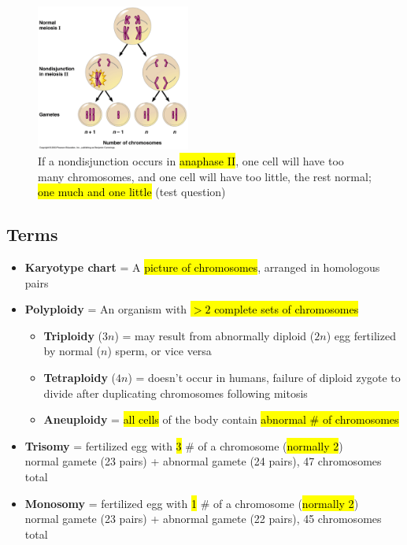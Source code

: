 \documentclass[a4paper,12pt]{article}
\begin{document}
\begin{figure}[H]
    \centering
    \includegraphics[width=0.45\textwidth]{nonj2}
    \caption{If a nondisjunction occurs in \hl{anaphase II}, one cell will have too many chromosomes, and one cell will have too little, the rest normal; \hl{one much and one little} (test question)}
\end{figure}

\subsection{Terms}
\begin{itemize}
    \item{\textbf{Karyotype chart} = A \hl{picture of chromosomes}, arranged in homologous pairs}
    \item{
            \textbf{Polyploidy} = An organism with \hl{$>2$ complete sets of chromosomes}
            \begin{itemize}
                \item{\textbf{Triploidy} ($3n$) = may result from abnormally diploid ($2n$) egg fertilized by normal ($n$) sperm, or vice versa}
                \item{\textbf{Tetraploidy} ($4n$) = doesn't occur in humans, failure of diploid zygote to divide after duplicating chromosomes following mitosis}
                \item{\textbf{Aneuploidy} = \hl{all cells} of the body contain \hl{abnormal \# of chromosomes}}
            \end{itemize}
        }
    \item{\textbf{Trisomy} = fertilized egg with \hl{3} \# of a chromosome (\hl{normally 2}) \\ normal gamete (23 pairs) + abnormal gamete (24 pairs), 47 chromosomes total}
    \item{\textbf{Monosomy} = fertilized egg with \hl{1} \# of a chromosome (\hl{normally 2}) \\ normal gamete (23 pairs) + abnormal gamete (22 pairs), 45 chromosomes total}
\end{itemize}
\end{document}
